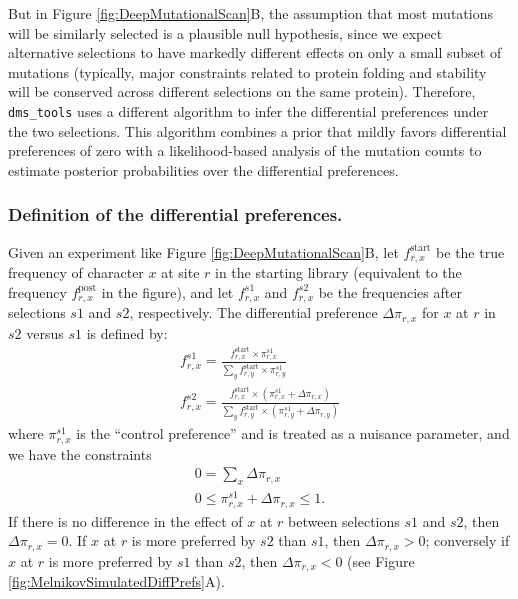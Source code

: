 \documentclass[twocolumn]{bmcart}%
\begin{document}
But in Figure \ref{fig:DeepMutationalScan}B, the assumption that most mutations will be similarly selected is a plausible null hypothesis, since we expect alternative selections to have markedly different effects on only a small subset of mutations (typically, major constraints related to protein folding and stability will be conserved across different selections on the same protein). Therefore, \texttt{dms\_tools} uses a different algorithm to infer the differential preferences under the two selections. This algorithm combines a prior that mildly favors differential preferences of zero with a likelihood-based analysis of the mutation counts to estimate posterior probabilities over the differential preferences.

\subsubsection*{Definition of the differential preferences.}
Given an experiment like Figure \ref{fig:DeepMutationalScan}B, let $f_{r,x}^{\textrm{start}}$ be the true frequency of character $x$ at site $r$ in the starting library (equivalent to the frequency $f_{r,x}^{\textrm{post}}$ in the figure), and let $f_{r,x}^{s1}$ and $f_{r,x}^{s2}$ be the frequencies after selections $s1$ and $s2$, respectively. The differential preference $\Delta\pi_{r,x}$ for $x$ at $r$ in $s2$ versus $s1$ is defined by:
\begin{gather}
\label{eq:controlpi}
f_{r,x}^{s1} = \frac{f_{r,x}^{\textrm{start}} \times \pi_{r,x}^{s1}}{\sum_y f_{r,y}^{\textrm{start}} \times \pi_{r,y}^{s1}} \\
\label{eq:deltapi}
f_{r,x}^{s2} = \frac{f_{r,x}^{\textrm{start}} \times \left(\pi_{r,x}^{s1} + \Delta\pi_{r,x}\right)}{\sum_y f_{r,y}^{\textrm{start}} \times \left(\pi_{r,y}^{s1} + \Delta\pi_{r,y}\right)}
\end{gather}
where $\pi_{r,x}^{s1}$ is the ``control preference'' and is treated as a nuisance parameter, and we have the constraints
\begin{gather}
\label{eq:diffprefsum}
0 = \sum\limits_x \Delta\pi_{r,x} \\
\label{eq:diffprefpluspref}
0 \le \pi_{r,x}^{s1} + \Delta\pi_{r,x} \le 1.
\end{gather}
If there is no difference in the effect of $x$ at $r$ between selections $s1$ and $s2$, then $\Delta\pi_{r,x} = 0$. If $x$ at $r$ is more preferred by $s2$ than $s1$, then $\Delta\pi_{r,x} > 0$; conversely if $x$ at $r$ is more preferred by $s1$ than $s2$, then $\Delta\pi_{r,x} < 0$ (see Figure \ref{fig:MelnikovSimulatedDiffPrefs}A).
\end{document}
